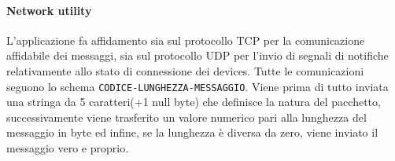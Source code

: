 \documentclass[11pt,a4paper,twocolumn,twoside]{paper}
\begin{document}
\paragraph{Network utility}
	L'applicazione fa affidamento sia sul protocollo TCP per la
    comunicazione affidabile dei messaggi, sia sul protocollo UDP per
    l'invio di segnali di notifiche relativamente allo stato di
    connessione dei devices. Tutte le comunicazioni seguono lo schema
    \texttt{CODICE-LUNGHEZZA-MESSAGGIO}. Viene prima di tutto inviata
    una stringa da 5 caratteri(+1 null byte) che definisce la natura del
    pacchetto, successivamente viene trasferito un valore numerico pari
    alla lunghezza del messaggio in byte ed infine, se la lunghezza è
    diversa da zero, viene inviato il messaggio vero e proprio.
\end{document}
